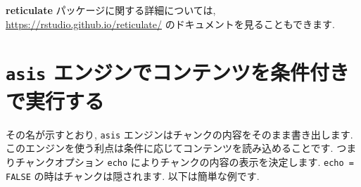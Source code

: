\documentclass[
  11pt,
  lualatex,
  ja=standard]{bxjsreport}
\newenvironment{Shaded}{\begin{snugshade}}{\end{snugshade}}
\newcommand{\InformationTok}[1]{\textcolor[rgb]{0.56,0.35,0.01}{\textbf{\textit{#1}}}}
\newcommand{\NormalTok}[1]{#1}
\begin{document}
\begin{Shaded}
\end{Shaded}

\textbf{reticulate} パッケージに関する詳細については, \url{https://rstudio.github.io/reticulate/} のドキュメントを見ることもできます.

\hypertarget{eng-asis}{%
\section{\texorpdfstring{\texttt{asis} エンジンでコンテンツを条件付きで実行する}{asis エンジンでコンテンツを条件付きで実行する}}\label{eng-asis}}

その名が示すとおり, \texttt{asis} エンジンはチャンクの内容をそのまま書き出します. このエンジンを使う利点は条件に応じてコンテンツを読み込めることです. つまりチャンクオプション \texttt{echo} によりチャンクの内容の表示を決定します. \texttt{echo = FALSE} の時はチャンクは隠されます. 以下は簡単な例です.
\end{document}
